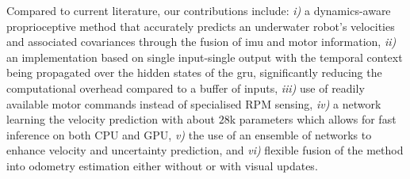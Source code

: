 Compared to current literature, our contributions include: \textit{i)} a dynamics-aware proprioceptive method that accurately predicts an underwater robot's velocities and associated covariances through the fusion of \ac{imu} and motor information, \textit{ii)} an implementation based on single input-single output with the temporal context being propagated over the hidden states of the \ac{gru}, significantly reducing the computational overhead compared to a buffer of inputs, \textit{iii)} use of readily available motor commands instead of specialised RPM sensing, \textit{iv)} a network learning the velocity prediction with about $28$k parameters which allows for fast inference on both CPU and GPU, \textit{v)} the use of an ensemble of networks to enhance velocity and uncertainty prediction, and \textit{vi)} flexible fusion of the method into odometry estimation either without or with visual updates. 